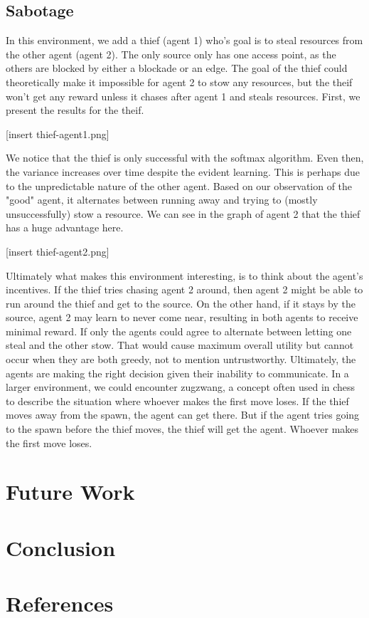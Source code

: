 \documentclass[11pt]{article}
\begin{document}
\subsection{Sabotage}

In this environment, we add a thief (agent 1) who's goal is to steal resources from the other agent (agent 2). The only source only has one access point, as the others are blocked by either a blockade or an edge. The goal of the thief could theoretically make it impossible for agent 2 to stow any resources, but the theif won't get any reward unless it chases after agent 1 and steals resources. First, we present the results for the theif.

[insert thief-agent1.png]

We notice that the thief is only successful with the softmax algorithm. Even then, the variance increases over time despite the evident learning. This is perhaps due to the unpredictable nature of the other agent. Based on our observation of the "good" agent, it alternates between running away and trying to (mostly unsuccessfully) stow a resource. We can see in the graph of agent 2 that the thief has a huge advantage here. 

[insert thief-agent2.png]

Ultimately what makes this environment interesting, is to think about the agent's incentives. If the thief tries chasing agent 2 around, then agent 2 might be able to run around the thief and get to the source. On the other hand, if it stays by the source, agent 2 may learn to never come near, resulting in both agents to receive minimal reward. If only the agents could agree to alternate between letting one steal and the other stow. That would cause maximum overall utility but cannot occur when they are both greedy, not to mention untrustworthy. Ultimately, the agents are making the right decision given their inability to communicate. In a larger environment, we could encounter zugzwang, a concept often used in chess to describe the situation where whoever makes the first move loses. If the thief moves away from the spawn, the agent can get there. But if the agent tries going to the spawn before the thief moves, the thief will get the agent. Whoever makes the first move loses.

\section{Future Work}

\section{Conclusion}

\section{References}
\end{document}
